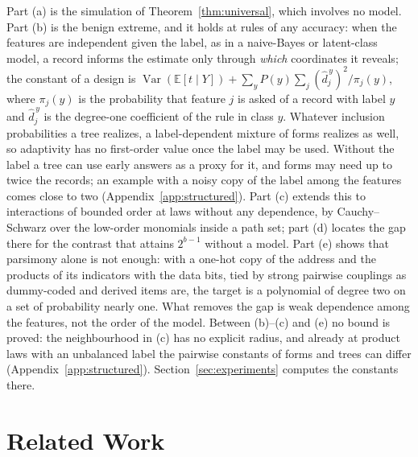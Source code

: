 \documentclass{article}
\newcommand{\E}{\mathbb{E}}
\newcommand{\Var}{\operatorname{Var}}
\begin{document}
Part (a) is the simulation of Theorem~\ref{thm:universal}, which involves no model. Part (b) is the benign extreme, and it holds at rules of any accuracy: when the features are independent given the label, as in a naive-Bayes or latent-class model, a record informs the estimate only through \emph{which} coordinates it reveals; the constant of a design is $\Var(\E[t\mid Y])+\sum_yP(y)\sum_j(\hat d^{\,y}_j)^2/\pi_j(y)$, where $\pi_j(y)$ is the probability that feature $j$ is asked of a record with label $y$ and $\hat d^{\,y}_j$ is the degree-one coefficient of the rule in class $y$. Whatever inclusion probabilities a tree realizes, a label-dependent mixture of forms realizes as well, so adaptivity has no first-order value once the label may be used. Without the label a tree can use early answers as a proxy for it, and forms may need up to twice the records; an example with a noisy copy of the label among the features comes close to two (Appendix~\ref{app:structured}). Part (c) extends this to interactions of bounded order at laws without any dependence, by Cauchy--Schwarz over the low-order monomials inside a path set; part (d) locates the gap there for the contrast that attains $2^{b-1}$ without a model. Part (e) shows that parsimony alone is not enough: with a one-hot copy of the address and the products of its indicators with the data bits, tied by strong pairwise couplings as dummy-coded and derived items are, the target is a polynomial of degree two on a set of probability nearly one. What removes the gap is weak dependence among the features, not the order of the model. Between (b)--(c) and (e) no bound is proved: the neighbourhood in (c) has no explicit radius, and already at product laws with an unbalanced label the pairwise constants of forms and trees can differ (Appendix~\ref{app:structured}). Section~\ref{sec:experiments} computes the constants there.



\section{Related Work}\label{sec:related}
\end{document}
